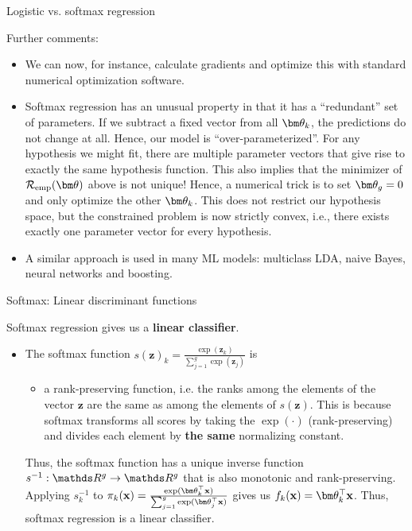 \documentclass[11pt,compress,t,notes=noshow, xcolor=table]{beamer}
\begin{document}
\begin{vbframe}{Logistic vs. softmax regression}

Further comments:

\begin{itemize}

\item We can now, for instance, calculate gradients and optimize this with standard numerical optimization software.


\item Softmax regression has an unusual property in that it has a \enquote{redundant} set of parameters. If we subtract a fixed vector
  from all $\thetav_k$, the predictions do not change at all.
  Hence,  our model is \enquote{over-parameterized}. For any hypothesis we might fit,
  there are multiple parameter vectors that give rise to exactly the same hypothesis function.
  This also implies that the minimizer of $\risket$ above is not unique!
  Hence, a numerical trick is to set $\thetav_g = 0$ and only optimize the other $\thetav_k$. This does not restrict our hypothesis space, but the constrained problem is now strictly convex, i.e., there exists exactly one parameter vector for every hypothesis.

\item A similar approach is used in many ML models: multiclass LDA, naive Bayes, neural networks and boosting.

\end{itemize}

\end{vbframe} 

\begin{vbframe}{Softmax: Linear discriminant functions}

Softmax regression gives us a \textbf{linear classifier}. 

\begin{itemize}
  \item The softmax function $s(\bm{z})_k = \frac{\exp(\bm{z}_k)}{\sum_{j = 1}^g \exp \left(\bm{z}_j\right)}$ is 

\begin{itemize}
  \item a rank-preserving function, i.e.  the ranks among the elements of the vector $\bm{z}$ are the same as among the elements of $s(\bm{z})$. This is because softmax transforms all scores by taking the $\exp(\cdot)$ (rank-preserving) and divides each element by \textbf{the same} normalizing constant. 
\end{itemize}

Thus, the softmax function has a unique inverse function $s^{-1}: \R^g \to \R^g$ that is also monotonic and rank-preserving. Applying $s_k^{-1}$ to $\pi_k(\xv) = \frac{\exp(\thetav_k^\top \xv)}{\sum_{j = 1}^g \exp(\thetav_j^\top \xv)}$ gives us $f_k(\xv) = \thetav_k^\top \xv$. Thus, softmax regression is a linear classifier. 
\end{itemize}

\end{vbframe}
\end{document}
